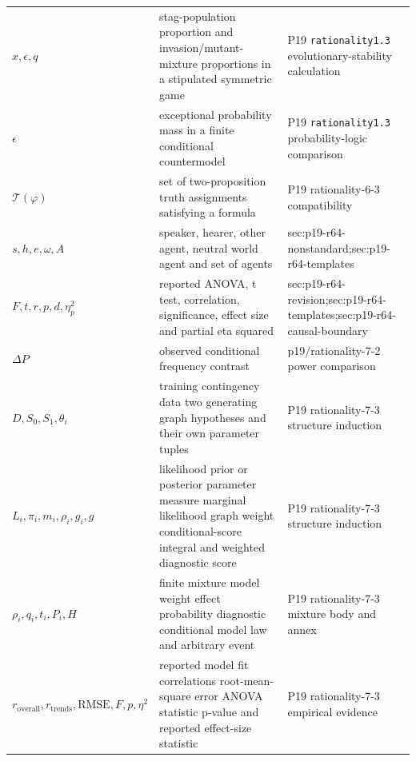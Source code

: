 \begin{longtable}{@{}p{}p{}p{}@{}}
\(x,\allowbreak \epsilon,\allowbreak q\) & stag-population proportion and invasion/mutant-mixture proportions in a stipulated symmetric game & P19 \texttt{rationality1.\allowbreak{}3} evolutionary-\allowbreak{}stability calculation \\
\(\epsilon\) & exceptional probability mass in a finite conditional countermodel & P19 \texttt{rationality1.\allowbreak{}3} probability-\allowbreak{}logic comparison \\
\(\mathcal T(\varphi)\) & set of two-proposition truth assignments satisfying a formula & P19 rationality-\allowbreak{}6-\allowbreak{}3 compatibility \\
\(s,\allowbreak h,\allowbreak e,\allowbreak \omega,\allowbreak A\) & speaker, hearer, other agent, neutral world agent and set of agents & sec:\allowbreak{}p19-\allowbreak{}r64-\allowbreak{}nonstandard;sec:\allowbreak{}p19-\allowbreak{}r64-\allowbreak{}templates \\
\(F,\allowbreak t,\allowbreak r,\allowbreak p,\allowbreak d,\allowbreak \eta_p^2\) & reported ANOVA, t test, correlation, significance, effect size and partial eta squared & sec:\allowbreak{}p19-\allowbreak{}r64-\allowbreak{}revision;sec:\allowbreak{}p19-\allowbreak{}r64-\allowbreak{}templates;sec:\allowbreak{}p19-\allowbreak{}r64-\allowbreak{}causal-\allowbreak{}boundary \\
\(\Delta P\) & observed conditional frequency contrast & p19/\allowbreak{}rationality-\allowbreak{}7-\allowbreak{}2 power comparison \\
\(D,\allowbreak S_0,\allowbreak S_1,\allowbreak \theta_i\) & training contingency data two generating graph hypotheses and their own parameter tuples & P19 rationality-\allowbreak{}7-\allowbreak{}3 structure induction \\
\(L_i,\allowbreak \pi_i,\allowbreak m_i,\allowbreak \rho_i,\allowbreak g_i,\allowbreak g\) & likelihood prior or posterior parameter measure marginal likelihood graph weight conditional-score integral and weighted diagnostic score & P19 rationality-\allowbreak{}7-\allowbreak{}3 structure induction \\
\(\rho_i,\allowbreak q_i,\allowbreak t_i,\allowbreak P_i,\allowbreak H\) & finite mixture model weight effect probability diagnostic conditional model law and arbitrary event & P19 rationality-\allowbreak{}7-\allowbreak{}3 mixture body and annex \\
\(r_{\mathrm{overall}},\allowbreak r_{\mathrm{trends}},\allowbreak \mathrm{RMSE},\allowbreak F,\allowbreak p,\allowbreak \eta^2\) & reported model fit correlations root-mean-square error ANOVA statistic p-value and reported effect-size statistic & P19 rationality-\allowbreak{}7-\allowbreak{}3 empirical evidence \\

\end{longtable}
